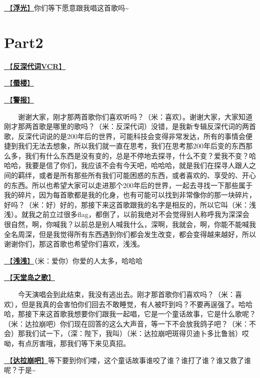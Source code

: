 \documentclass[]{ctexbook}
\begin{document}
\hyperref[floating-light]{🎵【\textbf{浮光}】}你们等下愿意跟我唱这首歌吗\textasciitilde{}

\section{Part2}\label{shanghai-20240519-part2}

\hyperref[senself-vcr]{🎥【\textbf{反深代词VCR}】}

\hyperref[mirage]{🎵【\textbf{蜃楼}】}

\hyperref[the-giver]{🎵【\textbf{警报}】}

  谢谢大家，刚才那两首歌你们喜欢听吗？（米：喜欢）。谢谢大家，大家知道刚才那两首歌是哪里的歌吗？（米：反深代词）没错，是我新专辑反深代词的两首歌，反深代词说的是200年后的世界，可能科技会变得非常发达，所有的事情会便捷到我们无法去想象，所以我们就一直在思考，我们在思考那200年后变的东西那么多，我们有什么东西是没有变的，总是不停地去探寻，什么不变？爱我不变？哈哈哈，我要是信了你们，我应该不会有今天吧，哈哈哈，就是我们在探寻人跟人之间的羁绊，或者是所有那些所有我们可能困惑的东西，或者喜欢的、享受的、开心的东西。所以也希望大家可以走进那个200年后的世界，一起去寻找一下那些属于我的碎片，因为每首歌都是我的化身，也有可能可以找到非常像你的那一块碎片，好吗？（米：好）好的，那接下来这首歌跟我的名字是相反的，所以它叫（米：浅浅）。就我之前立过很多flag，都倒了，以前我绝对不会觉得别人称呼我为深深会很自然，啊，你喊我？以前总是别人喊我什么，深啊，我就会，啊，你能不能喊我全名周深，但是我觉得所有东西遇到你们都会发生改变，都会变得越来越好，所以谢谢你们，那这首歌也希望你们喜欢，浅浅。

\hyperref[qianqian]{🎵【\textbf{浅浅}】}（米：爱你）你爱的人太多，哈哈哈

\hyperref[haven-song]{🎵【\textbf{天堂岛之歌}】}

  今天演唱会到此结束，我没有逃出去。刚才那首歌你们喜欢吗？（米：喜欢），但是我真的会害怕你们回去不敢睡觉，有人被吓到吗？不要再逞强了。哈哈哈，那接下来这首歌我想要你们跟我一起唱，它是一个童话故事，它是什么歌呢？（米：达拉崩吧）你们现在回答的这么大声音，等一下不会放我鸽子吧？（米：不会）那我们试一下，（深：陛下，我叫）（米：达拉崩吧斑得贝迪卜多比鲁翁）哎呦，有点厉害哦，那我们等下来见真招。

\hyperref[dalabengba]{🎵【\textbf{达拉崩吧}】}等下要到你们喽，这个童话故事谁咬了谁？谁打了谁？谁又救了谁呢？于是\textasciitilde{}
\end{document}
